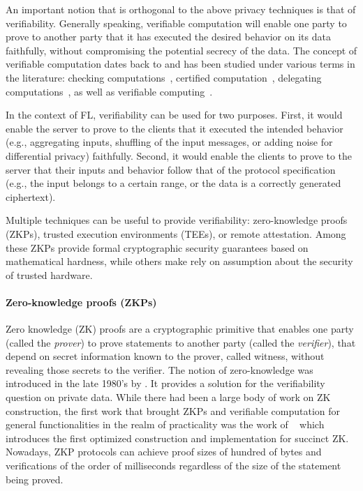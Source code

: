 \documentclass[11pt]{article}
\begin{document}
An important notion that is orthogonal to the above privacy techniques is that of verifiability. Generally speaking, verifiable computation will enable one party to prove to another party that it has executed the desired behavior on its data faithfully, without compromising the potential secrecy of the data. The concept of verifiable computation dates back to \citet{DBLP:conf/stoc/BabaiFLS91} and has been studied under various terms in the literature: checking computations~\cite{DBLP:conf/stoc/BabaiFLS91}, certified computation~\cite{DBLP:journals/siamcomp/Micali00}, delegating computations~\cite{DBLP:conf/stoc/GoldwasserKR08}, as well as verifiable computing~\cite{DBLP:conf/crypto/GennaroGP10}.

In the context of FL, verifiability can be used for two purposes. First, it would enable the server to prove to the clients that it executed the intended behavior (e.g., aggregating inputs, shuffling of the input messages, or adding noise for differential privacy) faithfully. Second, it would enable the clients to prove to the server that their inputs and behavior follow that of the protocol specification (e.g., the input belongs to a certain range, or the data is a correctly generated ciphertext).

Multiple techniques can be useful to provide verifiability: zero-knowledge proofs (ZKPs), trusted execution environments (TEEs), or remote attestation. Among these ZKPs provide formal cryptographic security guarantees based on mathematical hardness, while others make rely on assumption about the security of trusted hardware.%

\paragraph{Zero-knowledge proofs (ZKPs)} Zero knowledge (ZK) proofs are a cryptographic primitive that enables one party (called the
\emph{prover}) to prove statements to another party (called the \emph{verifier}), that depend on secret
information known to the prover, called witness, without revealing those secrets to the verifier. The notion of zero-knowledge was introduced in the late 1980's by \citet{DBLP:journals/siamcomp/GoldwasserMR89}. It provides a solution for the verifiability question on private data. While 
there had been a large body of work on ZK construction, the first work that brought ZKPs and verifiable computation for general functionalities in the realm of practicality was the work of ~\citet{DBLP:journals/cacm/ParnoHG016} which introduces the first optimized construction and implementation for succinct ZK. Nowadays, ZKP protocols can achieve proof sizes of hundred of bytes and verifications of the order of milliseconds regardless of the size of the statement being proved.
\end{document}

